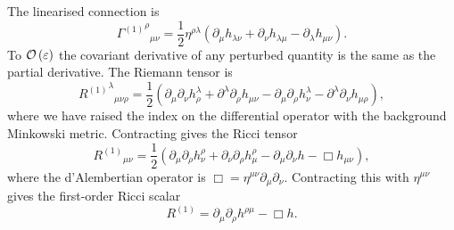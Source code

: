 The linearised connection is
\begin{equation}
{{\Gamma^{(1)}}^\rho}_{\mu\nu} = \dfrac{1}{2}\eta^{\rho\lambda}(\partial_\mu h_{\lambda\nu} + \partial_\nu h_{\lambda\mu} - \partial_\lambda h_{\mu\nu}).
\label{eq:Lin_Gamma}
\end{equation}
To $\mathcal{O}\left({\varepsilon}\right)$ the covariant derivative of any perturbed quantity is the same as the partial derivative. The Riemann tensor is
\begin{equation}
{{R^{(1)}}^\lambda}_{\mu\nu\rho} = \dfrac{1}{2}(\partial_\mu\partial_\nu h^\lambda_\rho + \partial^\lambda\partial_\rho h_{\mu\nu} - \partial_\mu\partial_\rho h^\lambda_\nu - \partial^\lambda\partial_\nu h_{\mu\rho}),
\label{eq:Lin_Riemann}
\end{equation}
where we have raised the index on the differential operator with the background Minkowski metric. Contracting gives the Ricci tensor
\begin{equation}
{R^{(1)}}_{\mu\nu} = \dfrac{1}{2}(\partial_\mu\partial_\rho h^\rho_\nu + \partial_\nu\partial_\rho h^\rho_\mu - \partial_\mu\partial_\nu h - \Box h_{\mu\nu}),
\label{eq:Ricci}
\end{equation}
where the d'Alembertian operator is $\Box = \eta^{\mu\nu}\partial_\mu\partial_\nu$. Contracting this with $\eta^{\mu\nu}$ gives the first-order Ricci scalar
\begin{equation}
R^{(1)} = \partial_\mu\partial_\rho h^{\rho\mu} - \Box h.
\label{eq:Scalar}
\end{equation}

